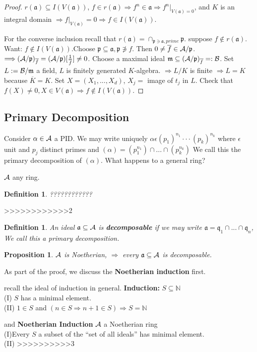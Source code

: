 \documentclass[11pt]{article}
\newtheorem{prop}[thm]{Proposition}
\newtheorem{dfn}[thm]{Definition}
\newcommand{\sca}{{\mathfrak a}}
\newcommand{\scm}{{\mathfrak m}}
\newcommand{\scp}{{\mathfrak p}}
\newcommand{\scq}{\mathfrak q}
\newcommand{\cala}{{\cal A}}
\newcommand{\calb}{{\cal B}}
\newcommand{\Lrta}{\Longrightarrow}
\begin{document}
\begin{proof}
$r(\sca)\subseteq I(V(\sca))$, $f\in r(\sca)\Lrta f^n\in \sca\Lrta f^n|_{V(\sca)=0}$, and $K$ is an integral domain $\Lrta f|_{V(\sca)}=0$$\Lrta f\in I(V(\sca))$. 

For the converse inclusion recall that $r(\sca)=\cap_{\scp\ni \sca, prime}\scp$. suppose $f\notin  r(\sca) $. Want: $f\notin I(V(\sca))$.Choose $\scp\subseteq \sca,\scp \not \ni f$. Then $0\neq \overline{f}\in \cala/\scp$. $\Lrta (\cala/\scp)_{\overline{f}}=(\cala/\scp)[\frac{1}{\overline{f}}]\neq 0$. Choose a maximal ideal $\scm\subseteq (\cala/\scp)_{\overline{f}}=:\calb$. Set $L:=\calb/\scm$ a field, $L$ is finitely generated $K$-algebra. $\Lrta L/K $ is finite $\Lrta L=K$ because $\overline{K}=K$. Set $X=(X_1,...,X_d)$, $X_j=$ image of $t_j$ in $L$. Check that $f(X)\neq 0,X\in V(\sca)\Lrta f\notin I(V(\sca))$.
\end{proof}

\subsection*{Primary Decomposition}
Consider $\alpha\in \cala$ a PID. We may write uniquely $\alpha\epsilon (p_1)^{n_1}\cdot \cdot\cdot (p_k)^{n_k}$ where $\epsilon$ unit and $p_j$ distinct  primes and $(\alpha)=(p_1^{n_1})\cap...\cap(p_k^{n_k})$ We call this the primary decomposition of $(\alpha)$. What happens to a general ring?

$\cala$ any ring.
\begin{dfn}
????????????
\end{dfn}
>>>>>>>>>>>>2
\begin{dfn}
An ideal $\sca\subseteq \cala$ is \textbf{decomposable} if we may write $\sca=\scq_1\cap...\cap \scq_n$, We call this a primary decomposition.
\end{dfn}
\begin{prop}
$\cala$ is Noetherian, $\Lrta$ every $\sca\subseteq \cala$ is decomposable. 
\end{prop}
As part of the proof, we discuss the \textbf{Noetherian induction} first.

recall the ideal of induction in general.
\textbf{Induction:} $S\subseteq \mathbb{N}$\\
(I) $S$ has a minimal element.\\
(II) $1\in S$ and $(n\in S\Lrta n+1\in S)\Lrta S=\mathbb{N}$

and 
\textbf{Noetherian Induction} $\cala$ a Noetherian ring\\
(I)Every $S$ a subset of the ``set of all ideals'' has minimal element.
\\
(II)
>>>>>>>>>>3 
\end{document}
